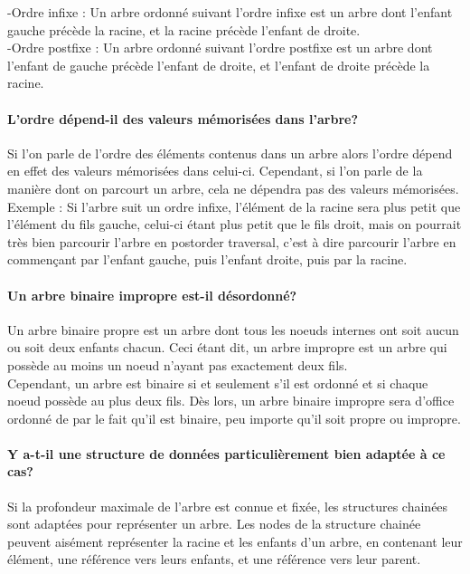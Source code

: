 \documentclass[a4paper]{article}
\begin{document}
-Ordre infixe : Un arbre ordonné suivant l'ordre infixe est un arbre dont l'enfant gauche précède la racine, et la racine précède l'enfant de droite.  \\

-Ordre postfixe : Un arbre ordonné suivant l'ordre postfixe est un arbre dont l'enfant de gauche précède l'enfant de droite, et l'enfant de droite précède la racine.   \\
\paragraph{L'ordre dépend-il des valeurs mémorisées dans l'arbre?}


Si l'on parle de l'ordre des éléments contenus dans un arbre alors l'ordre dépend en effet des valeurs mémorisées dans celui-ci. Cependant, si l'on parle de la manière dont on parcourt un arbre, cela ne dépendra pas des valeurs mémorisées.  \\

Exemple : Si l'arbre suit un ordre infixe, l'élément de la racine sera plus petit que l'élément du fils gauche, celui-ci étant plus petit que le fils droit, mais on pourrait très bien parcourir l'arbre en postorder traversal, c'est à dire parcourir l'arbre en commençant par l'enfant gauche, puis l'enfant droite, puis par la racine. 

\paragraph{Un arbre binaire impropre est-il désordonné?}

Un arbre binaire propre est un arbre dont tous les noeuds internes ont soit aucun ou soit deux enfants chacun. Ceci étant dit, un arbre impropre est un arbre qui possède au moins un noeud n'ayant pas exactement deux fils.\\

Cependant, un arbre est binaire si et seulement s'il est ordonné et si chaque noeud possède au plus deux fils. Dès lors, un arbre binaire impropre sera d'office ordonné de par le fait qu'il est binaire, peu importe qu'il soit propre ou impropre. 
\\

\paragraph{Y a-t-il une structure de données particulièrement bien adaptée à ce cas?}

Si la profondeur maximale de l'arbre est connue et fixée, les structures chainées sont adaptées pour représenter un arbre. Les nodes de la structure chainée peuvent aisément représenter la racine et les enfants d'un arbre, en contenant leur élément, une référence vers leurs enfants, et une référence vers leur parent. \\
\end{document}
